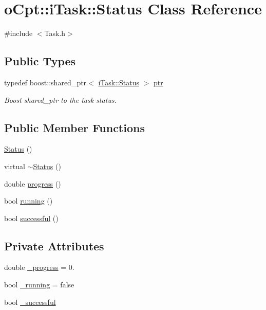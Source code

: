 \hypertarget{classo_cpt_1_1i_task_1_1_status}{}\section{o\+Cpt\+:\+:i\+Task\+:\+:Status Class Reference}
\label{classo_cpt_1_1i_task_1_1_status}


{\ttfamily \#include $<$Task.\+h$>$}

\subsection*{Public Types}
\begin{DoxyCompactItemize}
\item 
typedef boost\+::shared\+\_\+ptr$<$ \hyperlink{classo_cpt_1_1i_task_1_1_status}{i\+Task\+::\+Status} $>$ \hyperlink{classo_cpt_1_1i_task_1_1_status_aaf766c58d038e2defc3de2dddb92d1eb}{ptr}
\begin{DoxyCompactList}\small\item\em Boost shared\+\_\+ptr to the task status. \end{DoxyCompactList}\end{DoxyCompactItemize}
\subsection*{Public Member Functions}
\begin{DoxyCompactItemize}
\item 
\hyperlink{classo_cpt_1_1i_task_1_1_status_a5fab36410db264d0b9815f34227f33d0}{Status} ()
\item 
virtual \hyperlink{classo_cpt_1_1i_task_1_1_status_a80bab1abd55406ce11f5878c2bf5f500}{$\sim$\+Status} ()
\item 
double \hyperlink{classo_cpt_1_1i_task_1_1_status_abc4f40acb0a7b5f73407cefb01187ae8}{progress} ()
\item 
bool \hyperlink{classo_cpt_1_1i_task_1_1_status_aeaab915a0c1d317727087f070d5d64a1}{running} ()
\item 
bool \hyperlink{classo_cpt_1_1i_task_1_1_status_a4140c14ea06f86f87553fa979ccd1836}{successful} ()
\end{DoxyCompactItemize}
\subsection*{Private Attributes}
\begin{DoxyCompactItemize}
\item 
double \hyperlink{classo_cpt_1_1i_task_1_1_status_acaf00b89021b6b962cc0fe8d8ea01b85}{\+\_\+progress} = 0.
\item 
bool \hyperlink{classo_cpt_1_1i_task_1_1_status_ab9896a94738163478468028599a8e4f7}{\+\_\+running} = false
\item 
bool \hyperlink{classo_cpt_1_1i_task_1_1_status_acac4794c074b5483c0c05f68c3689df9}{\+\_\+successful}
\end{DoxyCompactItemize}


